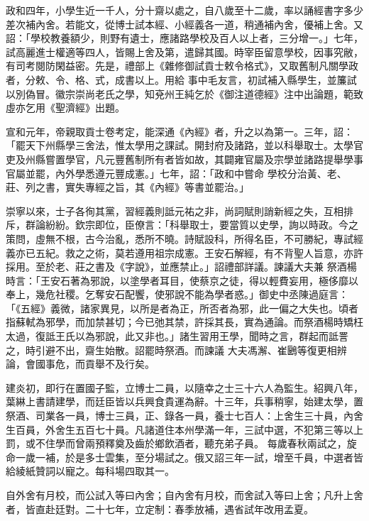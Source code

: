\begin{pinyinscope}
 政和四年，小學生近一千人，分十齋以處之，自八歲至十二歲，率以誦經書字多少差次補內舍。若能文，從博士試本經、小經義各一道，稍通補內舍，優補上舍。又詔：「學校教養額少，則野有遺士，應諸路學校及百人以上者，三分增一。」七年，試高麗進士權適等四人，皆賜上舍及第，遣歸其國。時宰臣留意學校，因事究敝，有司考閱防閑益密。先是，禮部上《雜修御試貢士敕令格式》，又取舊制凡關學政者，分敕、令、格、式，成書以上。用給
 事中毛友言，初試補入縣學生，並簾試以別偽冒。徽宗崇尚老氏之學，知兗州王純乞於《御注道德經》注中出論題，範致虛亦乞用《聖濟經》出題。



 宣和元年，帝親取貢士卷考定，能深通《內經》者，升之以為第一。三年，詔：「罷天下州縣學三舍法，惟太學用之課試。開封府及諸路，並以科舉取士。太學官吏及州縣嘗置學官，凡元豐舊制所有者皆如故，其闢雍官屬及宗學並諸路提舉學事官屬並罷，內外學悉遵元豐成憲。」七年，詔：「政和中嘗命
 學校分治黃、老、莊、列之書，實失專經之旨，其《內經》等書並罷治。」



 崇寧以來，士子各徇其黨，習經義則詆元祐之非，尚詞賦則誚新經之失，互相排斥，群論紛紛。欽宗即位，臣僚言：「科舉取士，要當質以史學，詢以時政。今之策問，虛無不根，古今治亂，悉所不曉。詩賦設科，所得名臣，不可勝紀，專試經義亦已五紀。救之之術，莫若遵用祖宗成憲。王安石解經，有不背聖人旨意，亦許採用。至於老、莊之書及《字說》，並應禁止。」詔禮部詳議。諫議大夫兼
 祭酒楊時言：「王安石著為邪說，以塗學者耳目，使蔡京之徒，得以輕費妄用，極侈靡以奉上，幾危社稷。乞奪安石配饗，使邪說不能為學者惑。」御史中丞陳過庭言：「《五經》義微，諸家異見，以所是者為正，所否者為邪，此一偏之大失也。頃者指蘇軾為邪學，而加禁甚切；今已弛其禁，許採其長，實為通論。而祭酒楊時矯枉太過，復詆王氏以為邪說，此又非也。」諸生習用王學，聞時之言，群起而詆詈之，時引避不出，齋生始散。詔罷時祭酒。而諫議
 大夫馮澥、崔鶠等復更相辨論，會國事危，而貢舉不及行矣。



 建炎初，即行在置國子監，立博士二員，以隨幸之士三十六人為監生。紹興八年，葉綝上書請建學，而廷臣皆以兵興食貴運為辭。十三年，兵事稍寧，始建太學，置祭酒、司業各一員，博士三員，正、錄各一員，養士七百人：上舍生三十員，內舍生百員，外舍生五百七十員。凡諸道住本州學滿一年，三試中選，不犯第三等以上罰，或不住學而曾兩預釋奠及齒於鄉飲酒者，聽充弟子員。
 每歲春秋兩試之，旋命一歲一補，於是多士雲集，至分場試之。俄又詔三年一試，增至千員，中選者皆給綾紙贊詞以寵之。每科場四取其一。



 自外舍有月校，而公試入等曰內舍；自內舍有月校，而舍試入等曰上舍；凡升上舍者，皆直赴廷對。二十七年，立定制：春季放補，遇省試年改用孟夏。




\end{pinyinscope}
